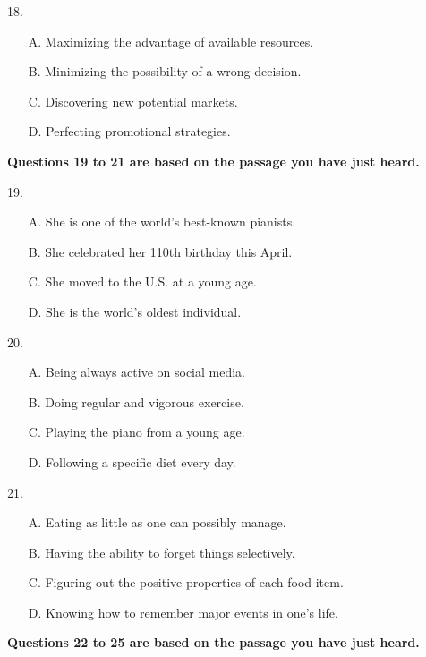 \documentclass[UTF8,11pt]{ctexart}
\begin{document}
18.


\begin{itemize}[leftmargin=2em,itemsep=.2em,topsep=.4em]\item[A.] Maximizing the advantage of available resources.
\item[B.] Minimizing the possibility of a wrong decision.
\item[C.] Discovering new potential markets.
\item[D.] Perfecting promotional strategies.
\end{itemize}

\textbf{Questions 19 to 21 are based on the passage you have just heard.}


19.


\begin{itemize}[leftmargin=2em,itemsep=.2em,topsep=.4em]\item[A.] She is one of the world’s best-known pianists.
\item[B.] She celebrated her 110th birthday this April.
\item[C.] She moved to the U.S. at a young age.
\item[D.] She is the world’s oldest individual.
\end{itemize}

20.


\begin{itemize}[leftmargin=2em,itemsep=.2em,topsep=.4em]\item[A.] Being always active on social media.
\item[B.] Doing regular and vigorous exercise.
\item[C.] Playing the piano from a young age.
\item[D.] Following a specific diet every day.
\end{itemize}

21.


\begin{itemize}[leftmargin=2em,itemsep=.2em,topsep=.4em]\item[A.] Eating as little as one can possibly manage.
\item[B.] Having the ability to forget things selectively.
\item[C.] Figuring out the positive properties of each food item.
\item[D.] Knowing how to remember major events in one’s life.
\end{itemize}

\textbf{Questions 22 to 25 are based on the passage you have just heard.}
\end{document}
